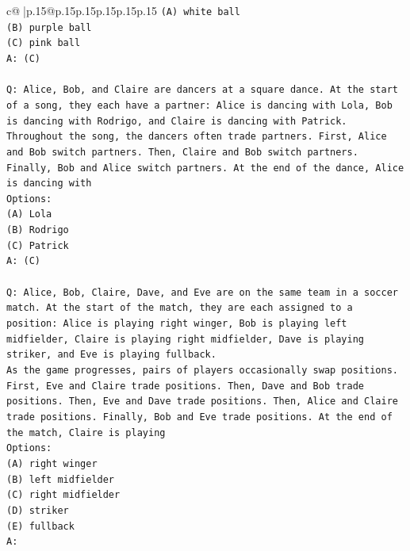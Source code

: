 \documentclass{article}
\begin{document}
{\begin{supertabular}{c@{$\;$}|p{.15\linewidth}@{}p{.15\linewidth}p{.15\linewidth}p{.15\linewidth}p{.15\linewidth}p{.15\linewidth}}
{{{\texttt{(A) white ball} \\
\texttt{(B) purple ball} \\
\texttt{(C) pink ball} \\
\texttt{A: (C)} \\
\\ 
\texttt{Q: Alice, Bob, and Claire are dancers at a square dance. At the start of a song, they each have a partner: Alice is dancing with Lola, Bob is dancing with Rodrigo, and Claire is dancing with Patrick.} \\
\texttt{Throughout the song, the dancers often trade partners. First, Alice and Bob switch partners. Then, Claire and Bob switch partners. Finally, Bob and Alice switch partners. At the end of the dance, Alice is dancing with} \\
\texttt{Options:} \\
\texttt{(A) Lola} \\
\texttt{(B) Rodrigo} \\
\texttt{(C) Patrick} \\
\texttt{A: (C)} \\
\\ 
\texttt{Q: Alice, Bob, Claire, Dave, and Eve are on the same team in a soccer match. At the start of the match, they are each assigned to a position: Alice is playing right winger, Bob is playing left midfielder, Claire is playing right midfielder, Dave is playing striker, and Eve is playing fullback.} \\
\texttt{As the game progresses, pairs of players occasionally swap positions. First, Eve and Claire trade positions. Then, Dave and Bob trade positions. Then, Eve and Dave trade positions. Then, Alice and Claire trade positions. Finally, Bob and Eve trade positions. At the end of the match, Claire is playing} \\
\texttt{Options:} \\
\texttt{(A) right winger} \\
\texttt{(B) left midfielder} \\
\texttt{(C) right midfielder} \\
\texttt{(D) striker} \\
\texttt{(E) fullback} \\
\texttt{A:} \\
            }
        }
    }
     \\ \\


\end{supertabular}}
\end{document}
